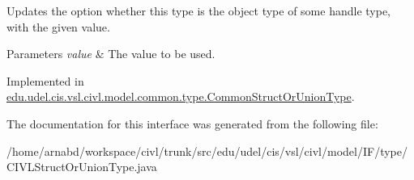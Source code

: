 Updates the option whether this type is the object type of some handle type, with the given value. 


\begin{DoxyParams}{Parameters}
{\em value} & The value to be used. \\
\hline
\end{DoxyParams}


Implemented in \hyperlink{classedu_1_1udel_1_1cis_1_1vsl_1_1civl_1_1model_1_1common_1_1type_1_1CommonStructOrUnionType_a13f0c78b266e2485a675737cf0ad9468}{edu.\+udel.\+cis.\+vsl.\+civl.\+model.\+common.\+type.\+Common\+Struct\+Or\+Union\+Type}.



The documentation for this interface was generated from the following file\+:\begin{DoxyCompactItemize}
\item 
/home/arnabd/workspace/civl/trunk/src/edu/udel/cis/vsl/civl/model/\+I\+F/type/C\+I\+V\+L\+Struct\+Or\+Union\+Type.\+java\end{DoxyCompactItemize}
